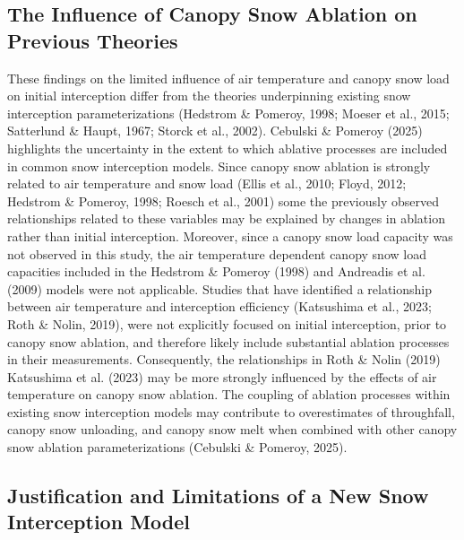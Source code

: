 \documentclass[
  letterpaper,
  DIV=11,
  numbers=noendperiod]{scrartcl}
\begin{document}
\subsection{The Influence of Canopy Snow Ablation on Previous
Theories}\label{the-influence-of-canopy-snow-ablation-on-previous-theories}

These findings on the limited influence of air temperature and canopy
snow load on initial interception differ from the theories underpinning
existing snow interception parameterizations (Hedstrom \& Pomeroy, 1998;
Moeser et al., 2015; Satterlund \& Haupt, 1967; Storck et al., 2002).
Cebulski \& Pomeroy (2025) highlights the uncertainty in the extent to
which ablative processes are included in common snow interception
models. Since canopy snow ablation is strongly related to air
temperature and snow load (Ellis et al., 2010; Floyd, 2012; Hedstrom \&
Pomeroy, 1998; Roesch et al., 2001) some the previously observed
relationships related to these variables may be explained by changes in
ablation rather than initial interception. Moreover, since a canopy snow
load capacity was not observed in this study, the air temperature
dependent canopy snow load capacities included in the Hedstrom \&
Pomeroy (1998) and Andreadis et al. (2009) models were not applicable.
Studies that have identified a relationship between air temperature and
interception efficiency (Katsushima et al., 2023; Roth \& Nolin, 2019),
were not explicitly focused on initial interception, prior to canopy
snow ablation, and therefore likely include substantial ablation
processes in their measurements. Consequently, the relationships in Roth
\& Nolin (2019) Katsushima et al. (2023) may be more strongly influenced
by the effects of air temperature on canopy snow ablation. The coupling
of ablation processes within existing snow interception models may
contribute to overestimates of throughfall, canopy snow unloading, and
canopy snow melt when combined with other canopy snow ablation
parameterizations (Cebulski \& Pomeroy, 2025).

\subsection{Justification and Limitations of a New Snow Interception
Model}\label{justification-and-limitations-of-a-new-snow-interception-model}
\end{document}
